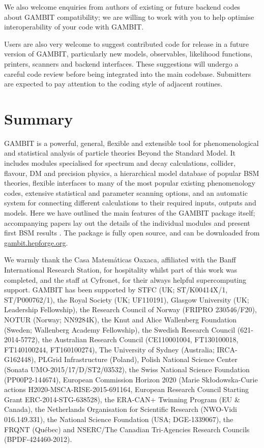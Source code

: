 \documentclass[pdftex,twocolumn,epjc3_preprint,runningheads]{svjour3}
\newcommand{\gambitacknosplus}{We warmly thank the Casa Matem\'aticas Oaxaca, affiliated with the Banff International Research Station, for hospitality whilst part of this work was completed, and the staff at Cyfronet, for their always helpful supercomputing support.  \GB has been supported by STFC (UK; ST/K00414X/1, ST/P000762/1), the Royal Society (UK; UF110191), Glasgow University (UK; Leadership Fellowship), the Research Council of Norway (FRIPRO 230546/F20), NOTUR (Norway; NN9284K), the Knut and Alice Wallenberg Foundation (Sweden; Wallenberg Academy Fellowship), the Swedish Research Council (621-2014-5772), the Australian Research Council (CE110001004, FT130100018, FT140100244, FT160100274), The University of Sydney (Australia; IRCA-G162448), PLGrid Infrastructure (Poland), Polish National Science Center (Sonata UMO-2015/17/D/ST2/03532), the Swiss National Science Foundation (PP00P2-144674), European Commission Horizon 2020 (Marie Sk\l{}odowska-Curie actions H2020-MSCA-RISE-2015-691164, European Research Council Starting Grant ERC-2014-STG-638528), the ERA-CAN+ Twinning Program (EU \& Canada), the Netherlands Organisation for Scientific Research (NWO-Vidi 016.149.331), the National Science Foundation (USA; DGE-1339067), the FRQNT (Qu\'ebec) and NSERC/The Canadian Tri-Agencies Research Councils (BPDF-424460-2012).}
\renewcommand{\_}{\discretionary{\underscore}{}{\underscore}}
\newcommand\term[1]{{\lstset{style=terminal}\lstinline!#1!\lstset{style=cpp}}}
\newcommand{\gambit}{\textsf{GAMBIT}\xspace}
\newcommand{\GB}{\gambit}
\newcommand{\Ben}[1]{\textbf{\color{magenta}Ben #1}}
\begin{document}
We also welcome enquiries from authors of existing or future backend codes about \GB compatibility; we are willing to work with you to help optimise interoperability of your code with \GB.

Users are also very welcome to suggest contributed code for release in a future version of \GB, particularly new models, observables, likelihood functions, printers, scanners and backend interfaces.  These suggestions will undergo a careful code review before being integrated into the main codebase.  Submitters are expected to pay attention to the coding style of adjacent routines.


\section{Summary}
\label{summary}
\GB is a powerful, general, flexible and extensible tool for phenomenological and statistical analysis of particle theories Beyond the Standard Model.  It includes modules specialised for spectrum and decay calculations, collider, flavour, DM and precision physics, a hierarchical model database of popular BSM theories, flexible interfaces to many of the most popular existing phenomenology codes, extensive statistical and parameter scanning options, and an automatic system for connecting different calculations to their required inputs, outputs and models.  Here we have outlined the main features of the \GB package itself; accompanying papers lay out the details of the individual modules \cite{ColliderBit,FlavBit,DarkBit,SDPBit,ScannerBit} and present first BSM results \cite{CMSSM,MSSM,SSDM}.  The package is fully open source, and can be downloaded from \href{http://gambit.hepforge.org}{gambit.hepforge.org}.

\begin{acknowledgements}
\gambitacknosplus
\end{acknowledgements}

\end{document}
